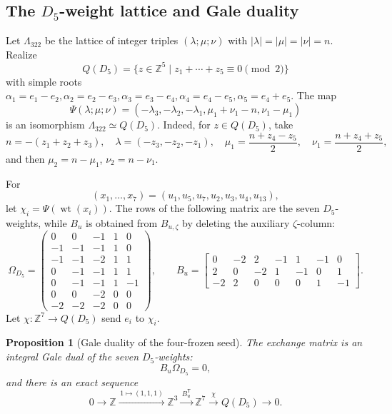 \documentclass[11pt,reqno]{amsart}
\numberwithin{equation}{section}
\newtheorem{proposition}[proposition]{Proposition}
\theoremstyle{remark}
\newcommand{\ZZ}{\mathbb{Z}}
\newcommand{\wt}{\operatorname{wt}}
\begin{document}
\subsection{The \texorpdfstring{$D_5$}{D5}-weight lattice and Gale duality}

Let $\Lambda_{322}$ be the lattice of integer triples
$(\lambda;\mu;\nu)$ with
$\lvert\lambda\rvert=\lvert\mu\rvert=\lvert\nu\rvert=n$.  Realize
\[ Q(D_5)=\{z\in\ZZ^5\mid z_1+\cdots+z_5\equiv0\pmod2\} \]
with simple roots
$\alpha_1=e_1-e_2,\alpha_2=e_2-e_3,\alpha_3=e_3-e_4,
\alpha_4=e_4-e_5,\alpha_5=e_4+e_5$.  The map
\[ \Psi(\lambda;\mu;\nu) =(-\lambda_3,-\lambda_2,-\lambda_1, \mu_1+\nu_1-n,\nu_1-\mu_1) \]
is an isomorphism $\Lambda_{322}\simeq Q(D_5)$.  Indeed, for
$z\in Q(D_5)$, take
\[ n=-(z_1+z_2+z_3),\quad \lambda=(-z_3,-z_2,-z_1),\quad \mu_1=\frac{n+z_4-z_5}{2},\quad \nu_1=\frac{n+z_4+z_5}{2}, \]
and then $\mu_2=n-\mu_1$, $\nu_2=n-\nu_1$.

For
\[ (x_1,\ldots,x_7)=(u_1,u_5,u_7,u_2,u_3,u_4,u_{13}), \]
let $\chi_i=\Psi(\wt(x_i))$.  The rows of the following matrix are the
seven $D_5$-weights, while $B_u$ is obtained from $B_{u,\zeta}$ by
deleting the auxiliary $\zeta$-column:
\[
 \Omega_{D_5}=
 \begin{pmatrix}
 0&0&-1&1&0\\
 -1&-1&-1&1&0\\
 -1&-1&-2&1&1\\
 0&-1&-1&1&1\\
 0&-1&-1&1&-1\\
 0&0&-2&0&0\\
 -2&-2&-2&0&0
 \end{pmatrix},
 \qquad
 B_u=
 \begin{bmatrix}
 0&-2& 2&-1& 1&-1& 0\\
 2& 0&-2& 1&-1& 0& 1\\
 -2& 2& 0& 0& 0& 1&-1
 \end{bmatrix}.
\]
Let $\chi:\ZZ^7\to Q(D_5)$ send $e_i$ to $\chi_i$.

\begin{proposition}[Gale duality of the four-frozen seed]
\label{prop:D5-Gale-duality}
The exchange matrix is an integral Gale dual of the seven $D_5$-weights:
\[ B_u\Omega_{D_5}=0, \]
and there is an exact sequence
\[ 0\longrightarrow\ZZ \xrightarrow{\,1\mapsto(1,1,1)\,}\ZZ^3 \xrightarrow{\,B_u^{\mathsf T}\,}\ZZ^7 \xrightarrow{\,\chi\,}Q(D_5)\longrightarrow0. \]
\end{proposition}
\end{document}
